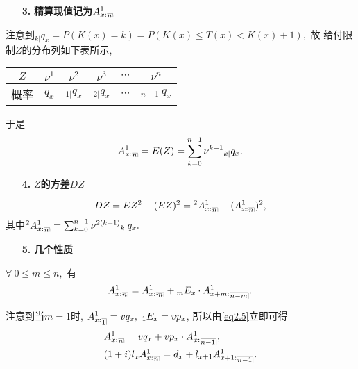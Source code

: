 \documentclass[a4paper,openany, 10pt]{ctexbook}
\makeatletter
\newcommand{\hei}{\CJKfamily{hei}}      %
\def\no{\nonumber}
\DeclareRobustCommand{\annu}[1]{_{%
    \def\arraystretch{0}%
    \setlength\arraycolsep{1pt}%
    \setlength\arrayrulewidth{.2pt}%
    \begin{array}[b]{@{}c|}\hline
        \\[\arraycolsep]%
        \scriptstyle #1%
    \end{array}%
}}
\makeatother
\begin{document}
\begin{itemize}
    \item[{\bf\hei 3.}]{\bf\hei 精算现值记为$A_{x:}^1{}_{\annu{n}}$}
\end{itemize}
注意到${}_{k|}q_x= P(K(x)=k)= P(K(x)\leq T(x) < K(x)+1),$ 故
给付限制$Z$的分布列如下表所示,
\begin{center}
    \begin{tabular}{ c|c|c|c|c|c }
        \hline
        $Z$ & $\nu^1$ & $\nu^2$      & $\nu^3$      & $\cdots$ & $\nu^n$        \\
        \hline
        概率  & $q_x$ & $_{1|}q_x$ & $_{2|}q_x$ & $\cdots$ & $_{n-1|}q_x$ \\
        \hline
    \end{tabular}
\end{center}
 于是$$A_{x:}^1{}_{\annu{n}} = E(Z) = \sum_{k=0}^{n-1}\nu^{k+1}{}_{k|}q_x.$$

\begin{itemize}
    \item[{\bf\hei 4.}]{\bf\hei $Z$的方差$DZ$}
\end{itemize}
$$DZ =EZ^2-(EZ)^2= {}^2A_{x:}^1{}_{\annu{n}} - (A_{x:}^1{}_{\annu{n}})^2,$$
其中${}^2A_{x:}^1{}_{\annu{n}} = \sum_{k=0}^{n-1}\nu^{2(k+1)}{}_{k|}q_x.$

\begin{itemize}
    \item [{\bf\hei 5.}] {\bf\hei 几个性质}
\end{itemize}
\begin{proposition}$\forall~0\leq m\leq n,$ 有
  \begin{align}\label{eq2.5}
    A_{x:}^1{}_{\annu{n}}=A_{x:}^1{}_{\annu m}+{}_mE_x\cdot A_{x+m:}^1{}_{\annu {n-m}}.
\end{align}
\end{proposition}
注意到当$m=1$时, $A_{x:}^1{}_{\annu{1}} = vq_x,~{}_1E_x = vp_x$, 所以由\eqref{eq2.5}立即可得
    \begin{align}
    &A_{x:}^1{}_{\annu{n}}=vq_x+vp_x\cdot A_{x:}^1{}_{\annu{n-1}},\no\\
&(1+i)l_x A_{x:}^1{}_{\annu{n}} = d_x + l_{x+1} A_{x+1:}^1{}_{\annu{n-1}}.\no
\end{align}
\end{document}
